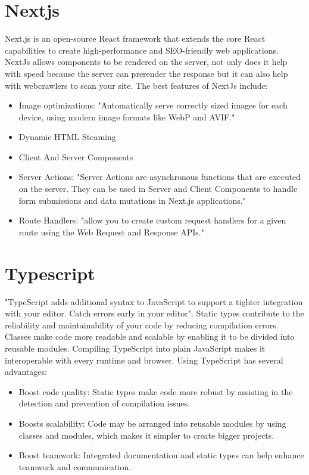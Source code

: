 \section{Nextjs}
\label{sec:ch3sec3}
Next.js is an open-source React framework that extends the core React capabilities to create high-performance and SEO-friendly web applications. NextJs allows components to be rendered on the server, not only does it help with speed because the server can prerender the response but it can also help with webcrawlers to scan your site. The best features of NextJs include:
\begin{itemize}
	\item Image optimizations: "Automatically serve correctly sized images for each device, using modern image formats like WebP and AVIF." \cite{nextImage}
	\item Dynamic HTML Steaming
	\item Client And Server Components
	\item Server Actions: "Server Actions are asynchronous functions that are executed on the server. They can be used in Server and Client Components to handle form submissions and data mutations in Next.js applications." \cite{nextServerActions}
	\item Route Handlers: "allow you to create custom request handlers for a given route using the Web Request and Response APIs." \cite{nextRouteHandlers}
\end{itemize}

\section{Typescript}
\label{sec:ch3sec4}
"TypeScript adds additional syntax to JavaScript to support a tighter integration with your editor. Catch errors early in your editor"\cite{typescript}. Static types contribute to the reliability and maintainability of your code by reducing compilation errors. Classes make code more readable and scalable by enabling it to be divided into reusable modules. Compiling TypeScript into plain JavaScript makes it interoperable with every runtime and browser.
Using TypeScript has several advantages:
\begin{itemize}
\item Boost code quality: Static types make code more robust by assisting in the detection and prevention of compilation issues.
\item Boosts scalability: Code may be arranged into reusable modules by using classes and modules, which makes it simpler to create bigger projects.
\item Boost teamwork: Integrated documentation and static types can help enhance teamwork and communication.
\end{itemize}

